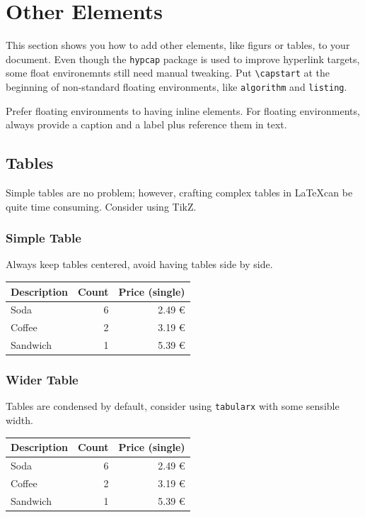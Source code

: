 \chapter{Other Elements}

This section shows you how to add other elements, like figurs or tables, to your document.
Even though the \texttt{hypcap} package is used to improve hyperlink targets, some float environemnts still need manual tweaking.
Put \texttt{\textbackslash{}capstart} at the beginning of non-standard floating environments, like \texttt{algorithm} and \texttt{listing}.

Prefer floating environments to having inline elements.
For floating environments, always provide a caption and a label plus reference them in text.

\section{Tables}

Simple tables are no problem; however, crafting complex tables in \LaTeX can be quite time consuming.
Consider using TikZ.

\subsection{Simple Table}

Always keep tables centered, avoid having tables side by side.

\begin{center}
\begin{tabular}{lrr}
	\toprule
	Description & Count & Price (single)\\
	\midrule
	Soda & 6 & 2.49 €\\
	Coffee & 2 & 3.19 €\\
	Sandwich & 1 & 5.39 €\\
	\bottomrule
\end{tabular}
\end{center}

\subsection{Wider Table}

Tables are condensed by default, consider using \texttt{tabularx} with some sensible width.

\begin{center}
\begin{tabularx}{0.75\textwidth}{Xrr}
	\toprule
	Description & Count & Price (single)\\
	\midrule
	Soda & 6 & 2.49 €\\
	Coffee & 2 & 3.19 €\\
	Sandwich & 1 & 5.39 €\\
	\bottomrule
\end{tabularx}
\end{center}


